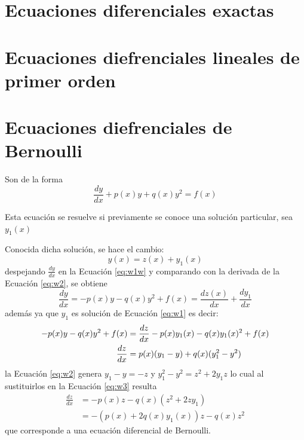 \documentclass[10pt,]{krantz}
\theoremstyle{definition}
\theoremstyle{definition}
\theoremstyle{definition}
\theoremstyle{remark}
\begin{document}
\hypertarget{ecuaciones-diferenciales-exactas}{%
\section{Ecuaciones diferenciales exactas}\label{ecuaciones-diferenciales-exactas}}

\hypertarget{ecuaciones-diefrenciales-lineales-de-primer-orden}{%
\section{Ecuaciones diefrenciales lineales de primer orden}\label{ecuaciones-diefrenciales-lineales-de-primer-orden}}

\hypertarget{ecuaciones-diefrenciales-de-bernoulli}{%
\section{Ecuaciones diefrenciales de Bernoulli}\label{ecuaciones-diefrenciales-de-bernoulli}}

Son de la forma
\begin{equation}
\frac{dy}{dx}+p(x)y+q(x)y^{2}=f(x)
\label{eq:w1w}
\end{equation}

Esta ecuación se resuelve si previamente se conoce una solución particular, sea \(y_{1}(x)\)

Conocida dicha solución, se hace el cambio:
\begin{equation}
y(x)=z(x)+y_{1}(x)
\label{eq:w2}
\end{equation}
despejando \(\frac{dy}{dx}\) en la Ecuación \eqref{eq:w1w} y comparando con la derivada de la Ecuación \eqref{eq:w2}, se obtiene
\[\frac{dy}{dx}=-p(x)y-q(x)y^{2}+f(x)=\frac {dz(x)}{dx}+\frac {dy_{1}}{dx}
\]
además ya que \(y_1\) es solución de Ecuación \eqref{eq:w1} es decir:
\begin{align}
-p(x)y-q(x)y^{2}+f(x)&=\frac {dz}{dx}-p(x)y_{1}(x)-q(x)y_{1}(x)^{2}+f(x)\notag\\
\frac{dz}{dx}&=p(x)(y_{1}-y)+q(x)(y_{1}^{2}-y^{2})\label{eq:w3}
\end{align}
la Ecuación \eqref{eq:w2} genera \(y_1-y=-z\) y \(y_1^2-y^2=z^2+2y_1z\) lo cual al sustituirlos en la Ecuación \eqref{eq:w3} resulta
\begin{align*}
\frac{dz}{dx}&=-p(x)z-q(x) \left(z^{2}+2zy_{1}\right)\\
&=-\left(p(x)+2q(x)y_{1}(x)\right)z-q(x)z^{2}
\end{align*}
que corresponde a una ecuación diferencial de Bernoulli.
\end{document}
